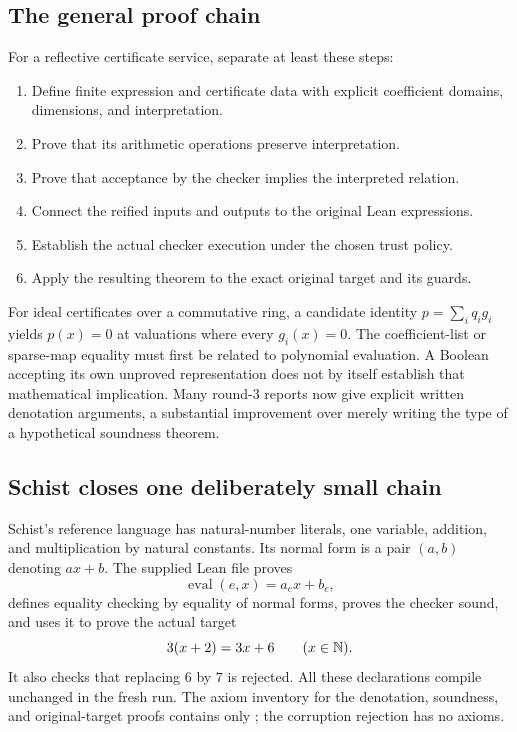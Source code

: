 \documentclass[11pt,letterpaper]{article}
\newcommand{\code}[1]{\texttt{\detokenize{#1}}}
\theoremstyle{definition}\newtheorem{definition}[proposition]{Definition}
\theoremstyle{remark}\newtheorem{remark}[proposition]{Remark}
\begin{document}
\subsection{The general proof chain}
For a reflective certificate service, separate at least these steps:
\begin{enumerate}
\item Define finite expression and certificate data with explicit coefficient
domains, dimensions, and interpretation.
\item Prove that its arithmetic operations preserve interpretation.
\item Prove that acceptance by the checker implies the interpreted relation.
\item Connect the reified inputs and outputs to the original Lean expressions.
\item Establish the actual checker execution under the chosen trust policy.
\item Apply the resulting theorem to the exact original target and its guards.
\end{enumerate}

For ideal certificates over a commutative ring, a candidate identity
$p=\sum_i q_i g_i$ yields $p(x)=0$ at valuations where every $g_i(x)=0$.
The coefficient-list or sparse-map equality must first be related to polynomial
evaluation. A Boolean accepting its own unproved representation does not by
itself establish that mathematical implication. Many round-3 reports now give
explicit written denotation arguments, a substantial improvement over merely
writing the type of a hypothetical soundness theorem.

\subsection{Schist closes one deliberately small chain}
Schist's reference language has natural-number literals, one variable,
addition, and multiplication by natural constants. Its normal form is a pair
$(a,b)$ denoting $ax+b$. The supplied Lean file proves
\[
 \operatorname{eval}(e,x)=a_e x+b_e,
\]
defines equality checking by equality of normal forms, proves the checker
sound, and uses it to prove the actual target
\[
 3(x+2)=3x+6\qquad(x\in\mathbb N).
\]
It also checks that replacing $6$ by $7$ is rejected. All these declarations
compile unchanged in the fresh run. The axiom inventory for the denotation,
soundness, and original-target proofs contains only \code{propext}; the
corruption rejection has no axioms.
\end{document}
